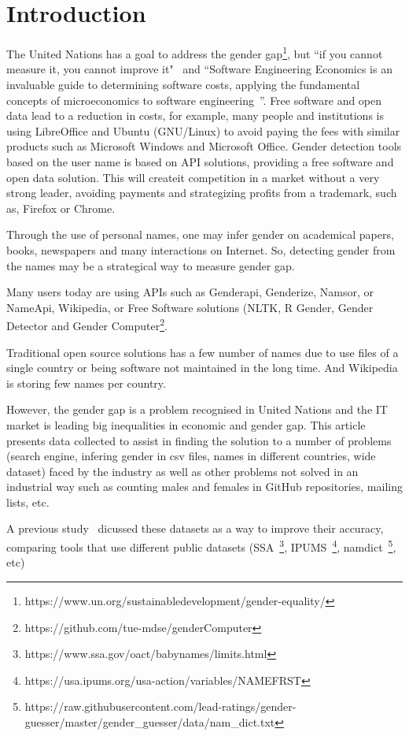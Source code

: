 \documentclass[a4paper]{article}
\begin{document}
\section{Introduction}
The United Nations has a goal to address the gender
gap\footnote{https://www.un.org/sustainabledevelopment/gender-equality/},
but ``if you cannot measure it, you cannot improve it"~\cite{thompson1833electrical}
and ``Software Engineering Economics is an invaluable guide to determining
software costs, applying the fundamental concepts of microeconomics
to software engineering~\cite{barry1981software}''. Free software and open
data lead to a reduction in costs, for example, many people and
institutions is using LibreOffice and Ubuntu (GNU/Linux) to avoid paying
the fees with similar products such as Microsoft Windows and Microsoft
Office. Gender detection tools based on the user name is based on API
solutions, providing a free software and open data solution. This will
createit competition in a market without a very strong leader, avoiding
payments and strategizing profits from a trademark, such as, Firefox or
Chrome.

Through the use of personal names, one may infer gender on
academical papers, books, newspapers and many interactions on Internet.
So, detecting gender from the names may be a strategical way to
measure gender gap.

Many users today are using APIs such as Genderapi, Genderize,
Namsor, or NameApi, Wikipedia, or Free Software solutions
(NLTK\cite{loper2002nltk}, R Gender, Gender Detector and Gender
Computer\footnote{https://github.com/tue-mdse/genderComputer}.

Traditional open source solutions has a few number of names due to
use files of a single country or being software not maintained in
the long time. And Wikipedia is storing few names per country.

However, the gender gap is a problem recognised in United Nations and
the IT market is leading big inequalities in economic and gender gap.
This article presents data collected to assist in finding the solution
to a number of problems (search engine, infering gender in csv files,
names in different countries, wide dataset) faced by
the industry as well as other problems not solved in an industrial way
such as counting males and females in GitHub repositories, mailing lists,
etc.

A previous study~\cite{karimi2016inferring} dicussed these datasets as
a way to improve their accuracy, comparing tools that use different
public datasets (SSA~\footnote{https://www.ssa.gov/oact/babynames/limits.html},
IPUMS~\footnote{https://usa.ipums.org/usa-action/variables/NAMEFRST},
namdict~\footnote{https://raw.githubusercontent.com/lead-ratings/gender-guesser/master/gender\_guesser/data/nam\_dict.txt}, etc)
\end{document}
